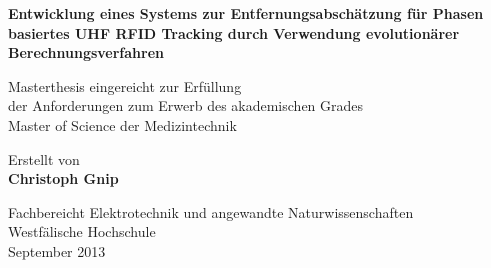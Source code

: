 
\begin{titlepage}
       \begin{center}
			{
			\Huge 
			\textbf{
			  Entwicklung eines Systems zur
			  Entfernungsabschätzung für Phasen basiertes UHF RFID Tracking durch Verwendung
			  evolutionärer Berechnungsverfahren
			}\par
			}
			\vspace{3cm}
			{
			\Large Masterthesis eingereicht zur Erfüllung\\
			der Anforderungen zum Erwerb des akademischen Grades\\
			Master of Science der Medizintechnik\\
			}
\vspace{2cm}

\large{Erstellt von}\\

\Large{\textbf{Christoph Gnip}}


\vfill

{\normalsize Fachbereicht Elektrotechnik und angewandte Naturwissenschaften
           \\Westfälische Hochschule\\[2ex]September 2013}


       \end{center}
   \end{titlepage}

\newpage
{}
\thispagestyle{empty}
\hspace{1cm}

\newpage
\normalsize


